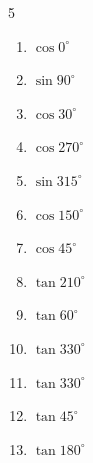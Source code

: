\begin{multicols}{5}
\begin{enumerate}
  \item $\displaystyle \cos{0^\circ}$

        \phantom{$\displaystyle =1$}

  \item $\displaystyle \sin{90^\circ}$

        \phantom{$\displaystyle =1$}

  \item $\displaystyle \cos{30^\circ}$


  \item $\displaystyle \cos{270^\circ}$

        \phantom{$\displaystyle =0$}

  \item $\displaystyle \sin{315^\circ}$


\columnbreak %

  \item $\displaystyle \cos{150^\circ}$


  \item $\displaystyle \cos{45^\circ}$


  \item $\displaystyle \tan{210^\circ}$


  \item $\displaystyle \tan{60^\circ}$


  \item $\displaystyle \tan{330^\circ}$


  \item $\displaystyle \tan{330^\circ}$


  \item $\displaystyle \tan{45^\circ}$

        \phantom{$\displaystyle =1$}

  \item $\displaystyle \tan{180^\circ}$


\end{enumerate}
\end{multicols}
